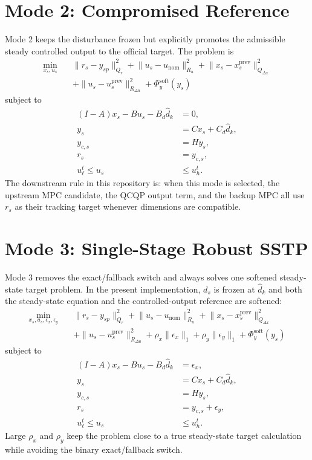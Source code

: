 \documentclass[11pt]{article}
\begin{document}
\section{Mode 2: Compromised Reference}
Mode 2 keeps the disturbance frozen but explicitly promotes the admissible steady controlled output to the official target. The problem is
\begin{align}
\min_{x_s,u_s}\quad &
\|r_s-y_{sp}\|_{Q_r}^2
\!+\!\|u_s-u_{\text{nom}}\|_{R_u}^2
\!+\!\|x_s-x_s^{\text{prev}}\|_{Q_{\Delta x}}^2 \\
&+\|u_s-u_s^{\text{prev}}\|_{R_{\Delta u}}^2
\!+\!\Phi_y^{\text{soft}}(y_s)
\end{align}
subject to
\begin{align}
(I-A)x_s - Bu_s - B_d \hat d_k &= 0, \\
y_s &= Cx_s + C_d \hat d_k, \\
y_{c,s} &= H y_s, \\
r_s &= y_{c,s}, \\
u_{\ell}^{t} \le u_s &\le u_{h}^{t}.
\end{align}
The downstream rule in this repository is: when this mode is selected, the upstream MPC candidate, the QCQP output term, and the backup MPC all use $r_s$ as their tracking target whenever dimensions are compatible.

\section{Mode 3: Single-Stage Robust SSTP}
Mode 3 removes the exact/fallback switch and always solves one softened steady-state target problem. In the present implementation, $d_s$ is frozen at $\hat d_k$ and both the steady-state equation and the controlled-output reference are softened:
\begin{align}
\min_{x_s,u_s,\epsilon_x,\epsilon_y}\quad &
\|r_s-y_{sp}\|_{Q_r}^2
\!+\!\|u_s-u_{\text{nom}}\|_{R_u}^2
\!+\!\|x_s-x_s^{\text{prev}}\|_{Q_{\Delta x}}^2 \\
&+\|u_s-u_s^{\text{prev}}\|_{R_{\Delta u}}^2
\!+\!\rho_x \|\epsilon_x\|_1
\!+\!\rho_y \|\epsilon_y\|_1
\!+\!\Phi_y^{\text{soft}}(y_s)
\end{align}
subject to
\begin{align}
(I-A)x_s - Bu_s - B_d \hat d_k &= \epsilon_x, \\
y_s &= Cx_s + C_d \hat d_k, \\
y_{c,s} &= H y_s, \\
r_s &= y_{c,s} + \epsilon_y, \\
u_{\ell}^{t} \le u_s &\le u_{h}^{t}.
\end{align}
Large $\rho_x$ and $\rho_y$ keep the problem close to a true steady-state target calculation while avoiding the binary exact/fallback switch.
\end{document}
